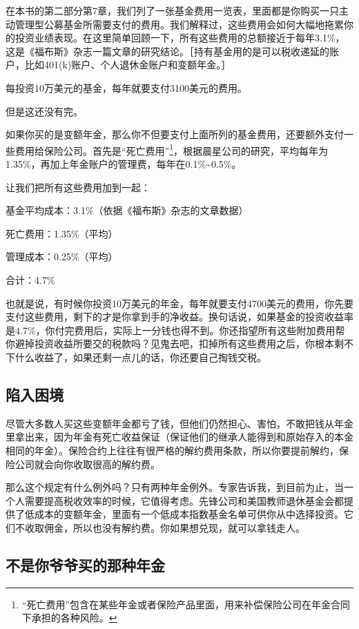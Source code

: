 在本书的第二部分第7章，我们列了一张基金费用一览表，里面都是你购买一只主动管理型公募基金所需要支付的费用。我们解释过，这些费用会如何大幅地拖累你的投资业绩表现。在这里简单回顾一下，所有这些费用的总额接近于每年3.1\%，这是《福布斯》杂志一篇文章的研究结论。［持有基金用的是可以税收递延的账户，比如401(k)账户、个人退休金账户和变额年金。］

每投资10万美元的基金，每年就要支付3100美元的费用。

但是这还没有完。

如果你买的是变额年金，那么你不但要支付上面所列的基金费用，还要额外支付一些费用给保险公司。首先是“死亡费用”\footnote{\label{fn:pdf-12-1}“死亡费用”包含在某些年金或者保险产品里面，用来补偿保险公司在年金合同下承担的各种风险。}，根据晨星公司的研究，平均每年为1.35\%，再加上年金账户的管理费，每年在0.1\%\textasciitilde{}0.5\%。

让我们把所有这些费用加到一起：

基金平均成本：3.1\%（依据《福布斯》杂志的文章数据）

死亡费用：1.35\%（平均）

管理成本：0.25\%（平均）

合计：4.7\%

也就是说，有时候你投资10万美元的年金，每年就要支付4700美元的费用，你先要支付这些费用，剩下的才是你拿到手的净收益。换句话说，如果基金的投资收益率是4.7\%，你付完费用后，实际上一分钱也得不到。你还指望所有这些附加费用帮你避掉投资收益所要交的税款吗？见鬼去吧，扣掉所有这些费用之后，你根本剩不下什么收益了，如果还剩一点儿的话，你还要自己掏钱交税。

\subsection{陷入困境}

尽管大多数人买这些变额年金都亏了钱，但他们仍然担心、害怕，不敢把钱从年金里拿出来，因为年金有死亡收益保证（保证他们的继承人能得到和原始存入的本金相同的年金）。保险合约上往往有很严格的解约费用条款，所以你要提前解约，保险公司就会向你收取很高的解约费。

那么这个规定有什么例外吗？只有两种年金例外。专家告诉我，到目前为止，当一个人需要提高税收效率的时候，它值得考虑。先锋公司和美国教师退休基金会都提供了低成本的变额年金，里面有一个低成本指数基金名单可供你从中选择投资。它们不收取佣金，所以也没有解约费。你如果想兑现，就可以拿钱走人。

\subsection{不是你爷爷买的那种年金}

